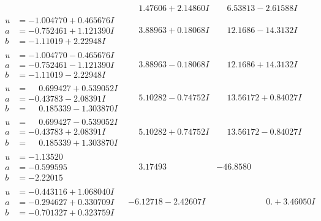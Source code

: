 \documentclass[1p]{elsarticle_modified}
\theoremstyle{definition}
\begin{document}
$$\begin{array}{c|c|c}
 & \phantom{-}1.47606 + 2.14860 I & \phantom{-}6.53813 - 2.61588 I \\ \hline\begin{aligned}
u &= -1.004770 + 0.465676 I \\
a &= -0.752461 + 1.121390 I \\
b &= -1.11019 + 2.22948 I\end{aligned}
 & \phantom{-}3.88963 + 0.18068 I & \phantom{-}12.1686 - 14.3132 I \\ \hline\begin{aligned}
u &= -1.004770 - 0.465676 I \\
a &= -0.752461 - 1.121390 I \\
b &= -1.11019 - 2.22948 I\end{aligned}
 & \phantom{-}3.88963 - 0.18068 I & \phantom{-}12.1686 + 14.3132 I \\ \hline\begin{aligned}
u &= \phantom{-}0.699427 + 0.539052 I \\
a &= -0.43783 - 2.08391 I \\
b &= \phantom{-}0.185339 - 1.303870 I\end{aligned}
 & \phantom{-}5.10282 - 0.74752 I & \phantom{-}13.56172 + 0.84027 I \\ \hline\begin{aligned}
u &= \phantom{-}0.699427 - 0.539052 I \\
a &= -0.43783 + 2.08391 I \\
b &= \phantom{-}0.185339 + 1.303870 I\end{aligned}
 & \phantom{-}5.10282 + 0.74752 I & \phantom{-}13.56172 - 0.84027 I \\ \hline\begin{aligned}
u &= -1.13520\phantom{ +0.000000I} \\
a &= -0.599595\phantom{ +0.000000I} \\
b &= -2.22015\phantom{ +0.000000I}\end{aligned}
 & \phantom{-}3.17493\phantom{ +0.000000I} & -46.8580\phantom{ +0.000000I} \\ \hline\begin{aligned}
u &= -0.443116 + 1.068040 I \\
a &= -0.294627 + 0.330709 I \\
b &= -0.701327 + 0.323759 I\end{aligned}
 & -6.12718 - 2.42607 I & \phantom{-0.000000 -}0. + 3.46050 I \\ \hline\begin{aligned}

\end{aligned}
\end{array}$$
\end{document}
